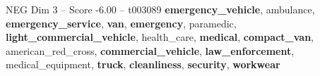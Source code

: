 \begin{textsample}{NEG Dim 3 – Score -6.00 – t003089}  \label{ex:f3_neg_018}
\textbf{emergency\_vehicle}, ambulance, \textbf{emergency\_service}, \textbf{van}, \textbf{emergency}, paramedic, \textbf{light\_commercial\_vehicle}, health\_care, \textbf{medical}, \textbf{compact\_van}, american\_red\_cross, \textbf{commercial\_vehicle}, \textbf{law\_enforcement}, medical\_equipment, \textbf{truck}, \textbf{cleanliness}, \textbf{security}, \textbf{workwear}

\end{textsample}
